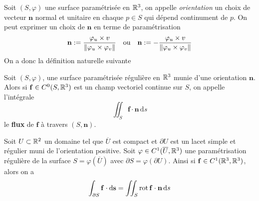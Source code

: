 
Soit $(S, \varphi)$ une surface paramétrisée en $\mathbb{R}^3$, on appelle \emph{orientation} un choix de vecteur $\bm n$ normal et	unitaire en chaque $p \in S$ qui dépend continument de $p$. On peut exprimer un choix de $\bm n$ en terme de paramétrisation
\[
\mathbf{n} : = \frac{\varphi_u \times v}{\left\|  \varphi_u \times \varphi_v \right\|} \quad \text{ou} \quad \mathbf{n} : = - \frac{\varphi_u \times v}{\left\|  \varphi_u \times \varphi_v \right\|}
\]
On a donc la définition naturelle suivante
\begin{definition}[Flux] \label{def: Flux}
	Soit $(S, \varphi)$, une surface paramétrisée régulière en $\mathbb{R}^3$ munie d'une orientation $\bm n$. Alors si $\mathbf{f} \in C^0(S, \mathbb{R}^3)$ est un champ vectoriel continue sur $S$, on appelle l'intégrale
	\[
	\iint_S \bm f \cdot \bm n \, \mathrm ds
	\]
	le \textbf{flux} de $\bm f$ à travers $(S,\bm n)$.
\end{definition}

\begin{theoreme} \label{thm: Théorème de Kelvin-Stokes}
	Soit $U \subset \mathbb{R}^2$ un domaine tel que $\overline U$ est compact et $\partial U$ est un lacet simple et régulier muni de l'orientation positive. Soit $\varphi \in C^1(\overline U, \mathbb{R}^3)$ une paramétrisation régulière de la surface $S = \varphi(\overline U)$ avec $\partial S = \varphi(\partial U)$. Ainsi si $\mathbf{f} \in C^1(\mathbb{R}^3, \mathbb{R}^3)$, alors on a 
	\[
	\int_{\partial S} \mathbf{f} \cdot \mathrm d \mathbf{s} = \iint_S \operatorname{rot} \mathbf{f} \cdot \mathbf{n} \, \mathrm ds
	\]
\end{theoreme}

